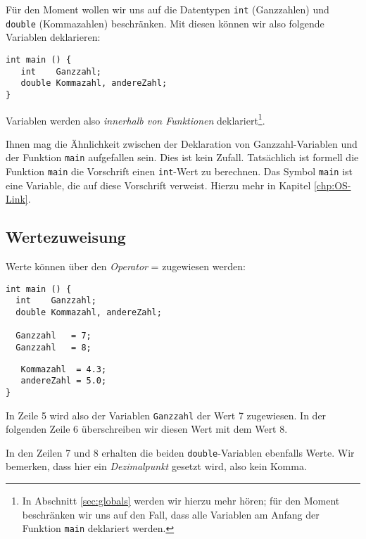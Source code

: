Für den Moment wollen wir uns auf die Datentypen \texttt{int} (Ganzzahlen) und \texttt{double} (Kommazahlen) beschränken. Mit diesen können wir also folgende Variablen deklarieren:
\begin{codebox}
\begin{verbatim}
int main () {
   int    Ganzzahl;
   double Kommazahl, andereZahl;
}
\end{verbatim}
\end{codebox}
Variablen werden also \emph{innerhalb von Funktionen} deklariert\footnote{In Abschnitt \ref{sec:globals} werden wir hierzu mehr hören; für den Moment beschränken wir uns auf den Fall, dass alle Variablen am Anfang der Funktion \texttt{main} deklariert werden.}.

Ihnen mag die Ähnlichkeit zwischen der Deklaration von Ganzzahl-Variablen und der Funktion \texttt{main} aufgefallen sein. Dies ist kein Zufall. Tatsächlich ist formell die Funktion \texttt{main} die Vorschrift einen \texttt{int}-Wert zu berechnen. Das Symbol \texttt{main} ist eine Variable, die auf diese Vorschrift verweist. Hierzu mehr in Kapitel \ref{chp:OS-Link}.

\subsection{Wertezuweisung} \label{sec:valueAssignment}
Werte können über den \emph{Operator} = zugewiesen werden:
\begin{codebox}
\begin{verbatim}
int main () {
  int    Ganzzahl;
  double Kommazahl, andereZahl;

  Ganzzahl   = 7;
  Ganzzahl   = 8;
\end{verbatim}
\end{codebox}

\begin{codebox}[]
\begin{verbatim}
   Kommazahl  = 4.3;
   andereZahl = 5.0;
}
\end{verbatim}
\end{codebox}

In Zeile 5 wird also der Variablen \texttt{Ganzzahl} der Wert 7 zugewiesen. In der folgenden Zeile 6 überschreiben wir diesen Wert mit dem Wert 8.

In den Zeilen 7 und 8 erhalten die beiden \texttt{double}-Variablen ebenfalls Werte. Wir bemerken, dass hier ein \emph{Dezimalpunkt} gesetzt wird, also kein Komma.

